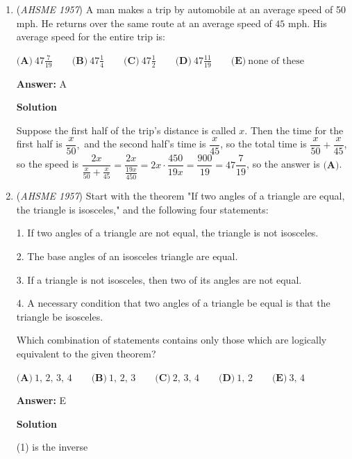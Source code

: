 \begin{enumerate}
 Using this same logic, $10011_2$ would be $1*2^4 + 1*2^1 + 1 * 2^0 = \boxed{\textbf{(A) }19}$.

 


	\item (\textit{AHSME 1957}) A man makes a trip by automobile at an average speed of 50 mph. He returns over the same route at an average speed of $45$ mph. 
His average speed for the entire trip is: 


 $\textbf{(A)}\ 47\frac{7}{19}\qquad  \textbf{(B)}\ 47\frac{1}{4}\qquad  \textbf{(C)}\ 47\frac{1}{2}\qquad  \textbf{(D)}\ 47\frac{11}{19}\qquad \textbf{(E)}\ \text{none of these}$

 \textbf{Answer: }A



\textbf{Solution}

Suppose the first half of the trip's distance is called $x$. Then the time for the first half is $\dfrac{x}{50},$ and the second half's time is $\dfrac{x}{45}$, so the total time is $\dfrac{x}{50}+\dfrac{x}{45}$, so the speed is $\dfrac{2x}{\frac{x}{50}+\frac{x}{45}}=\dfrac{2x}{\frac{19x}{450}}=2x \cdot \dfrac{450}{19x}=\dfrac{900}{19}=47\dfrac{7}{19}$, so the answer is $\boxed{\textbf{(A)}}$.

 


	\item (\textit{AHSME 1957}) Start with the theorem "If two angles of a triangle are equal, the triangle is isosceles," and the following four statements: 


 1. If two angles of a triangle are not equal, the triangle is not isosceles. 


 2. The base angles of an isosceles triangle are equal. 


 3. If a triangle is not isosceles, then two of its angles are not equal. 


 4. A necessary condition that two angles of a triangle be equal is that the triangle be isosceles. 


 Which combination of statements contains only those which are logically equivalent to the given theorem? 


 $\textbf{(A)}\ 1,\,2,\,3,\,4 \qquad \textbf{(B)}\ 1,\,2,\,3\qquad \textbf{(C)}\ 2,\,3,\,4\qquad \textbf{(D)}\ 1,\,2\qquad\textbf{(E)}\ 3,\,4$

 \textbf{Answer: }E



\textbf{Solution}

(1) is the inverse


\end{enumerate}
